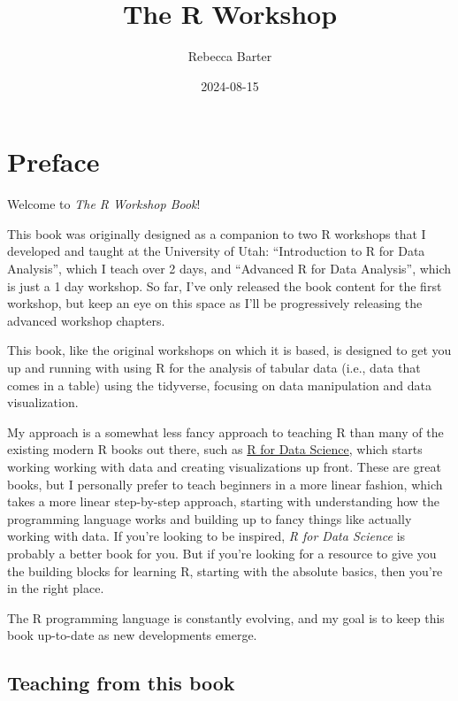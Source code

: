 \documentclass[
  letterpaper,
  DIV=11,
  numbers=noendperiod]{scrreprt}
\title{The R Workshop}
\author{Rebecca Barter}
\date{2024-08-15}
\renewcommand*\contentsname{Table of contents}
\newcommand\contentsname{Table of contents}
\begin{document}
\maketitle

\renewcommand*\contentsname{Table of contents}
{
\hypersetup{linkcolor=}
\setcounter{tocdepth}{2}
\tableofcontents
}


\chapter*{Preface}\label{preface}


Welcome to \emph{The R Workshop Book}!

This book was originally designed as a companion to two R workshops that
I developed and taught at the University of Utah: ``Introduction to R
for Data Analysis'', which I teach over 2 days, and ``Advanced R for
Data Analysis'', which is just a 1 day workshop. So far, I've only
released the book content for the first workshop, but keep an eye on
this space as I'll be progressively releasing the advanced workshop
chapters.

This book, like the original workshops on which it is based, is designed
to get you up and running with using R for the analysis of tabular data
(i.e., data that comes in a table) using the tidyverse, focusing on data
manipulation and data visualization.

My approach is a somewhat less fancy approach to teaching R than many of
the existing modern R books out there, such as
\href{https://r4ds.hadley.nz/}{R for Data Science}, which starts working
working with data and creating visualizations up front. These are great
books, but I personally prefer to teach beginners in a more linear
fashion, which takes a more linear step-by-step approach, starting with
understanding how the programming language works and building up to
fancy things like actually working with data. If you're looking to be
inspired, \emph{R for Data Science} is probably a better book for you.
But if you're looking for a resource to give you the building blocks for
learning R, starting with the absolute basics, then you're in the right
place.

The R programming language is constantly evolving, and my goal is to
keep this book up-to-date as new developments emerge.

\section*{Teaching from this book}\label{teaching-from-this-book}
\end{document}
